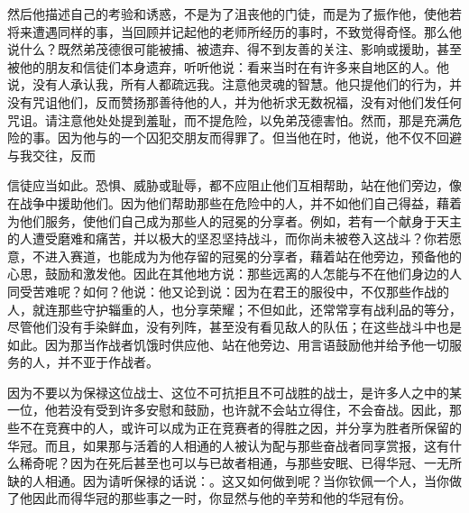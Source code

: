 然后他描述自己的考验和诱惑，不是为了沮丧他的门徒，而是为了振作他，使他若将来遭遇同样的事，当回顾并记起他的老师所经历的事时，不致觉得奇怪。那么他说什么？既然弟茂德很可能被捕、被遗弃、得不到友善的关注、影响或援助，甚至被他的朋友和信徒们本身遗弃，听听他说：看来当时在有许多来自地区的人。他说，没有人承认我，所有人都疏远我。注意他灵魂的智慧。他只提他们的行为，并没有咒诅他们，反而赞扬那善待他的人，并为他祈求无数祝福，没有对他们发任何咒诅。请注意他处处提到羞耻，而不提危险，以免弟茂德害怕。然而，那是充满危险的事。因为他与的一个囚犯交朋友而得罪了。但当他在时，他说，他不仅不回避与我交往，反而\par

\par

信徒应当如此。恐惧、威胁或耻辱，都不应阻止他们互相帮助，站在他们旁边，像在战争中援助他们。因为他们帮助那些在危险中的人，并不如他们自己得益，藉着为他们服务，使他们自己成为那些人的冠冕的分享者。例如，若有一个献身于天主的人遭受磨难和痛苦，并以极大的坚忍坚持战斗，而你尚未被卷入这战斗？你若愿意，不进入赛道，也能成为为他存留的冠冕的分享者，藉着站在他旁边，预备他的心思，鼓励和激发他。因此在其他地方说：那些远离的人怎能与不在他们身边的人同受苦难呢？如何？他说：他又论到说：因为在君王的服役中，不仅那些作战的人，就连那些守护辎重的人，也分享荣耀；不但如此，还常常享有战利品的等分，尽管他们没有手染鲜血，没有列阵，甚至没有看见敌人的队伍；在这些战斗中也是如此。因为那当作战者饥饿时供应他、站在他旁边、用言语鼓励他并给予他一切服务的人，并不亚于作战者。\par

因为不要以为保禄这位战士、这位不可抗拒且不可战胜的战士，是许多人之中的某一位，他若没有受到许多安慰和鼓励，也许就不会站立得住，不会奋战。因此，那些不在竞赛中的人，或许可以成为正在竞赛者的得胜之因，并分享为胜者所保留的华冠。而且，如果那与活着的人相通的人被认为配与那些奋战者同享赏报，这有什么稀奇呢？因为在死后甚至也可以与已故者相通，与那些安眠、已得华冠、一无所缺的人相通。因为请听保禄的话说：。这又如何做到呢？当你钦佩一个人，当你做了他因此而得华冠的那些事之一时，你显然与他的辛劳和他的华冠有份。\par

